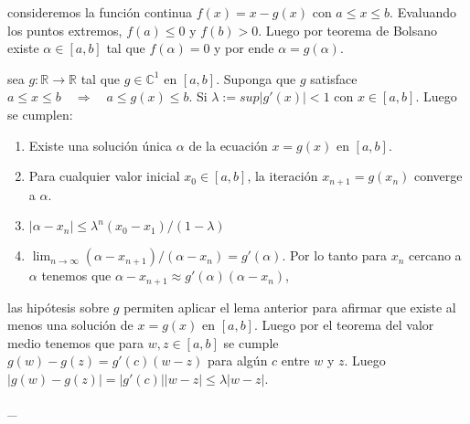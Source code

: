 \Demostracion consideremos la función continua \(f(x) = x - g(x)\) con
\(a \leq x \leq b\). Evaluando los puntos extremos, \(f(a) \leq 0\) y
\(f(b) > 0\). Luego por teorema de Bolsano existe \(\alpha \in [a,b]\)
tal que \(f(\alpha) = 0\) y por ende \(\alpha = g(\alpha)\).

\Teorema sea
\(g : \ensuremath{\mathbb{R}}\rightarrow \ensuremath{\mathbb{R}}\) tal
que \(g \in \mathbb{C}^1\) en \([a,b]\). Suponga que \(g\) satisface
\(a \leq x \leq b \ensuremath{\quad\Longrightarrow\quad}a \leq g(x) \leq b\).
Si \(\lambda := sup |g'(x)| < 1\) con \(x \in [a,b]\). Luego se cumplen:

\begin{enumerate}
\def\labelenumi{\arabic{enumi}.}
\tightlist
\item
  Existe una solución única \(\alpha\) de la ecuación \(x = g(x)\) en
  \([a,b]\).
\item
  Para cualquier valor inicial \(x_0 \in [a,b]\), la iteración
  \(x_{n+1} = g(x_n)\) converge a \(\alpha\).
\item
  \(|\alpha - x_n| \leq \lambda^n(x_0 - x_1) / (1-\lambda)\)
\item
  \(\ensuremath{\lim_{n \to \infty} (\alpha - x_{n+1}) / (\alpha - x_n)} = g'(\alpha)\).
  Por lo tanto para \(x_n\) cercano a \(\alpha\) tenemos que
  \(\alpha - x_{n+1} \approx g'(\alpha)(\alpha - x_n)\),
\end{enumerate}

\Demostracion las hipótesis sobre \(g\) permiten aplicar el lema
anterior para afirmar que existe al menos una solución de \(x = g(x)\)
en \([a,b]\). Luego por el teorema del valor medio tenemos que para
\(w, z \in [a,b]\) se cumple \(g(w) - g(z) = g'(c)(w-z)\) para algún
\(c\) entre \(w\) y \(z\). Luego
\(|g(w) - g(z)| = |g'(c)| |w-z| \leq \lambda |w - z|\).

\_

